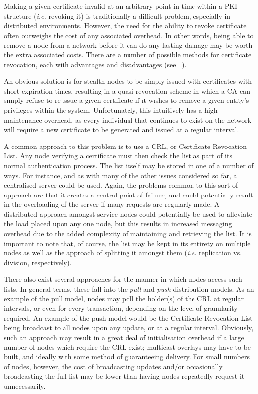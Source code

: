 \documentclass[pdftex,conference,10pt]{IEEEtran}
\begin{document}
Making a given certificate invalid at an arbitrary point in time within
a PKI structure (\emph{i.e.} revoking it) is traditionally a difficult
problem, especially in distributed environments. However, the need for
the ability to revoke certificate often outweighs the cost of any
associated overhead. In other words, being able to remove a node from a
network before it can do any lasting damage may be worth the extra
associated costs. There are a number of possible methods for
certificate revocation, each with advantages and disadvantages (see
~\cite{Zheng03Tradeoffs}).

An obvious solution is for stealth nodes to be simply issued with
certificates with short expiration times, resulting in a
quasi-revocation scheme in which a CA can simply refuse to re-issue a
given certificate if it wishes to remove a given entity's privileges
within the system. Unfortunately, this intuitively has a high
maintenance overhead, as every individual that continues to exist on
the network will require a new certificate to be generated and issued
at a regular interval.

A common approach to this problem is to use a CRL, or Certificate
Revocation List. Any node verifying a certificate must then check the
list as part of its normal authentication process. The list itself may
be stored in one of a number of ways. For instance, and as with many of
the other issues considered so far, a centralised server could be used.
Again, the problems common to this sort of approach are that it creates
a central point of failure, and could potentially result in the
overloading of the server if many requests are regularly made. A
distributed approach amongst service nodes could potentially be used to
alleviate the load placed upon any one node, but this results in
increased messaging overhead due to the added complexity of maintaining
and retrieving the list. It is important to note that, of course, the
list may be kept in its entirety on multiple nodes as well as the
approach of splitting it amongst them (\emph{i.e.} replication vs.
division, respectively).

There also exist several approaches for the manner in which nodes
access such lists. In general terms, these fall into the \emph{pull}
and \emph{push} distribution models. As an example of the pull model,
nodes may poll the holder(s) of the CRL at regular intervals, or even
for every transaction, depending on the level of granularity required.
An example of the push model would be the Certificate Revocation List
being broadcast to all nodes upon any update, or at a regular interval.
Obviously, such an approach may result in a great deal of
initialisation overhead if a large number of nodes which require the
CRL exist; multicast overlays may have to be built, and ideally with
some method of guaranteeing delivery. For small numbers of nodes,
however, the cost of broadcasting updates and/or occasionally
broadcasting the full list may be lower than having nodes repeatedly
request it unnecessarily.
\end{document}
